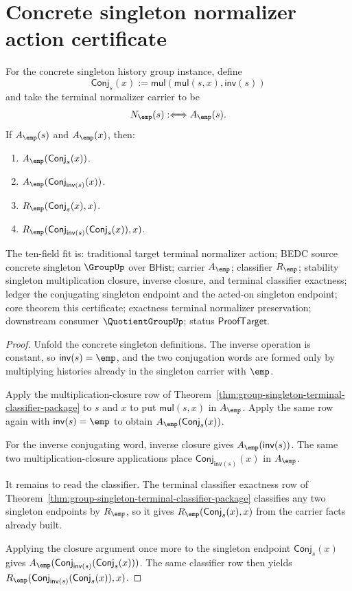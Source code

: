 \section{Concrete singleton normalizer action certificate}
\label{sec:group-singleton-normalizer-action-certificate}

\begin{theorem}
\label{thm:group-singleton-normalizer-action-certificate}
For the concrete singleton history group instance, define
$$
\mathsf{Conj}_s(x):=\mathsf{mul}(\mathsf{mul}(s,x),\mathsf{inv}(s))
$$
and take the terminal normalizer carrier to be
$$
N_{\emp}(s):\Longleftrightarrow A_{\emp}(s).
$$
If $A_{\emp}(s)$ and $A_{\emp}(x)$, then:
\begin{enumerate}
\item $A_{\emp}(\mathsf{Conj}_s(x))$.
\item $A_{\emp}(\mathsf{Conj}_{\mathsf{inv}(s)}(x))$.
\item $R_{\emp}(\mathsf{Conj}_s(x),x)$.
\item $R_{\emp}(\mathsf{Conj}_{\mathsf{inv}(s)}
(\mathsf{Conj}_s(x)),x)$.
\end{enumerate}
The ten-field fit is: traditional target terminal normalizer action; BEDC
source concrete singleton $\GroupUp$ over $\mathsf{BHist}$; carrier
$A_{\emp}$; classifier $R_{\emp}$; stability singleton multiplication
closure, inverse closure, and terminal classifier exactness; ledger the
conjugating singleton endpoint and the acted-on singleton endpoint; core
theorem this certificate; exactness terminal normalizer preservation;
downstream consumer $\QuotientGroupUp$; status $\mathsf{ProofTarget}$.
\end{theorem}
\begin{proof}
Unfold the concrete singleton definitions. The inverse operation is constant,
so $\mathsf{inv}(s)=\emp$, and the two conjugation words are formed only by
multiplying histories already in the singleton carrier with $\emp$.

Apply the multiplication-closure row of
Theorem~\ref{thm:group-singleton-terminal-classifier-package} to $s$ and $x$ to put
$\mathsf{mul}(s,x)$ in $A_{\emp}$. Apply the same row again with
$\mathsf{inv}(s)=\emp$ to obtain
$A_{\emp}(\mathsf{Conj}_s(x))$.

For the inverse conjugating word, inverse closure gives
$A_{\emp}(\mathsf{inv}(s))$. The same two multiplication-closure applications
place $\mathsf{Conj}_{\mathsf{inv}(s)}(x)$ in $A_{\emp}$.

It remains to read the classifier. The terminal classifier exactness row of
Theorem~\ref{thm:group-singleton-terminal-classifier-package} classifies any two
singleton endpoints by $R_{\emp}$, so it gives
$R_{\emp}(\mathsf{Conj}_s(x),x)$ from the carrier facts already built.

Applying the closure argument once more to the singleton endpoint
$\mathsf{Conj}_s(x)$ gives
$A_{\emp}(\mathsf{Conj}_{\mathsf{inv}(s)}(\mathsf{Conj}_s(x)))$. The same
classifier row then yields
$R_{\emp}(\mathsf{Conj}_{\mathsf{inv}(s)}(\mathsf{Conj}_s(x)),x)$.
\end{proof}
